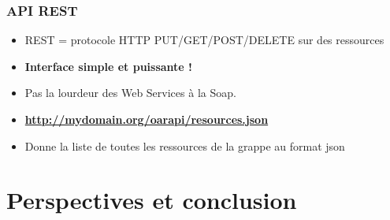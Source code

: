 \documentclass{beamer}
\begin{document}
\begin{frame}
  \frametitle{API REST}

  \begin{block}{}
    \begin{itemize}
      \item REST = protocole HTTP PUT/GET/POST/DELETE sur des ressources 
      \item {\bf Interface simple et puissante !}
      \item Pas la lourdeur des Web Services à la Soap.  
    \end{itemize}
  \end{block}

  \begin{block}{}
    \begin{itemize}
      \item {\bf  \url{http://mydomain.org/oarapi/resources.json} }
      \item  Donne la liste de toutes les ressources de la grappe au format json 
    \end{itemize}
  \end{block}


\end{frame}



\section{Perspectives et conclusion}
\end{document}
